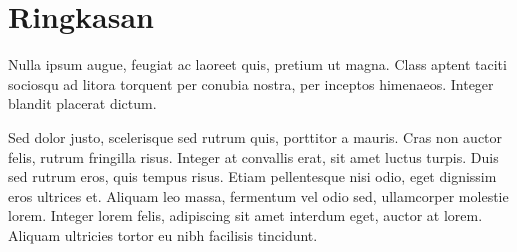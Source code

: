 \section{Ringkasan}
Nulla ipsum augue, feugiat ac laoreet quis, pretium ut magna. Class aptent taciti sociosqu ad litora torquent per conubia nostra, per inceptos himenaeos. Integer blandit placerat dictum.

Sed dolor justo, scelerisque sed rutrum quis, porttitor a mauris. Cras non auctor felis, rutrum fringilla risus. Integer at convallis erat, sit amet luctus turpis. Duis sed rutrum eros, quis tempus risus. Etiam pellentesque nisi odio, eget dignissim eros ultrices et. Aliquam leo massa, fermentum vel odio sed, ullamcorper molestie lorem. Integer lorem felis, adipiscing sit amet interdum eget, auctor at lorem. Aliquam ultricies tortor eu nibh facilisis tincidunt.